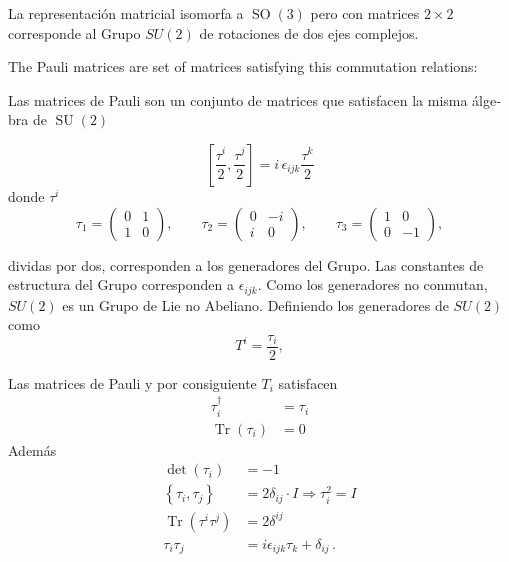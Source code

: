 La representación matricial isomorfa a $\operatorname{SO}(3)$ pero con matrices $2\times2$ corresponde al Grupo $SU(2)$ de rotaciones de dos ejes complejos.
\begin{english}
  The Pauli matrices are set of matrices satisfying this commutation relations:
\end{english}
\begin{spanish}
Las matrices de Pauli son un conjunto de matrices que satisfacen la misma álgebra de $\operatorname{SU}(2)$
\end{spanish}
\begin{frame}
\begin{equation}
  \label{eq:paulialg}
  \left[\frac{\tau^i}{2},\frac{\tau^j}{2} \right]=i\,\epsilon_{ijk}\frac{\tau^k}{2}
\end{equation}
donde $\tau^i$ 
\begin{equation}
  \label{eq:paulimatr}
  \tau_1=
  \begin{pmatrix}
    0&1\\
    1&0
  \end{pmatrix}, \qquad
 \tau_2=
  \begin{pmatrix}
    0&-i\\
    i&0
  \end{pmatrix},\qquad 
 \tau_3=
  \begin{pmatrix}
    1&0\\
    0&-1
  \end{pmatrix},
 \end{equation}

dividas por dos, corresponden a los generadores del Grupo. Las constantes de estructura del Grupo corresponden a $\epsilon_{ijk}$. Como los generadores no conmutan, $SU(2)$ es un Grupo de Lie no Abeliano. Definiendo los generadores de $SU(2)$ como
\begin{equation}
  T^i=\frac{\tau_i}{2},
\end{equation}
\end{frame}

Las matrices de Pauli y por consiguiente $T_i$ satisfacen 
\begin{align}
  \tau_i^\dagger&=\tau_i\nonumber\\
  \operatorname{Tr}  \left(
    \tau_i
  \right)&=0
\end{align}
Además
\begin{align}
  \label{eq:64qftw}
  \det
  \left(
    \tau_i
  \right)&=-1\nonumber\\
  \left\{ 
    \tau_i,\tau_j
  \right\}&=2\delta_{ij}\cdot I\Rightarrow\tau_i^2=I\nonumber \\
\operatorname{Tr} \left(\tau^i\tau^j\right)&=2\delta^{ij}\nonumber\\
\tau_i\tau_j&=i\epsilon_{ijk}\tau_k+\delta_{ij}\,.
\end{align}

